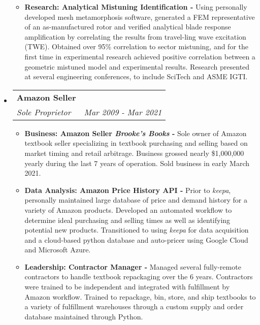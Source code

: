 \documentclass[letterpaper,11pt]{article}
\makeatletter
\newcommand{\resitem}[1]{\item #1 \vspace{-2pt}}
\newcommand{\ressubheading}[4]{
\begin{tabular*}{7.0in}{l@{\extracolsep{\fill}}r}
		\textbf{#1} & #2 \\
		\textit{#3} & \textit{#4} \\
\end{tabular*}\vspace{-6pt}}
\makeatother
\begin{document}
\begin{itemize}
\begin{itemize}
    \resitem{\textbf{Research: Analytical Mistuning Identification -} Using personally developed mesh metamorphosis software, generated a FEM representative of an as-manufactured rotor and verified analytical blade response amplification by correlating the results from travel-ling wave excitation (TWE).  Obtained over 95\% correlation to sector mistuning, and for the first time in experimental research achieved positive correlation between a geometric mistuned model and experimental results.  Research presented at several engineering conferences, to include SciTech and ASME IGTI.}
  \end{itemize}

\item
  \ressubheading{Amazon Seller}{}{Sole Proprietor}{Mar 2009 - Mar 2021}
  \begin{itemize}
    \resitem{\textbf{Business: Amazon Seller \textit{Brooke's Books} - } Sole owner of Amazon textbook seller specializing in textbook purchasing and selling based on market timing and retail arbitrage.  Business grossed nearly \$1,000,000 yearly during the last 7 years of operation.  Sold business in early March 2021.}
    \resitem{\textbf{Data Analysis: Amazon Price History API - } Prior to \textit{keepa}, personally maintained large database of price and demand history for a variety of Amazon products.  Developed an automated workflow to determine ideal purchasing and selling times as well as identifying potential new products.  Transitioned to using \textit{keepa} for data acquisition and a cloud-based python database and auto-pricer using Google Cloud and Microsoft Azure.}
    \resitem{\textbf{Leadership: Contractor Manager - } Managed several fully-remote contractors to handle textbook repackaging over the 6 years.  Contractors were trained to be independent and integrated with fulfillment by Amazon workflow. Trained to repackage, bin, store, and ship textbooks to a variety of fulfillment warehouses through a custom supply and order database maintained through Python.}
  \end{itemize}


\end{itemize}
\end{document}
